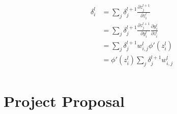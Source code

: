 \documentclass[a4paper, 12pt]{report}
\begin{document}
\begin{align*}
	\delta_i^l &= \sum_j \delta_j^{l+1} \frac{\partial z_j^{l+1}}{\partial z_i^l} \\
	&= \sum_j \delta_j^{l+1} \frac{\partial z_j^{l+1}}{\partial y_i^l} \frac{\partial y_i^l}{\partial z_i^l} \\
	&= \sum_j \delta_j^{l+1} w_{i,j}^l \phi'(z_i^l) \\
	&= \phi'(z_i^l) \sum_j \delta_j^{l+1} w_{i,j}^l \\
\end{align*}

\chapter{Project Proposal}
\end{document}
